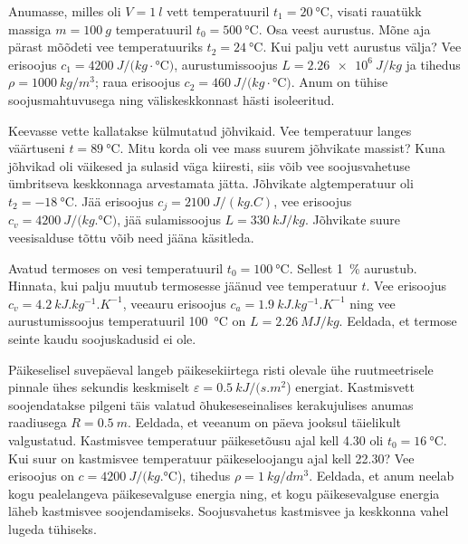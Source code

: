 \documentclass[10pt]{article}
\begin{document}
{
Anumasse, milles oli $V=\SI{1}{l}$ vett temperatuuril $t_1=\SI{20}{\degreeCelsius}$,
visati rauatükk massiga $m=\SI{100}{g}$ temperatuuril $t_0=\SI{500}{\degreeCelsius}$. Osa
veest aurustus. Mõne aja pärast mõõdeti vee temperatuuriks
$t_2=\SI{24}{\degreeCelsius}$. Kui palju vett aurustus välja? Vee erisoojus
$c_1=\SI{4200}{J/(kg\cdot\degreeCelsius)}$, aurustumissoojus $L=\SI{2,26 e6}{J/kg}$ ja
tihedus $\rho=\SI{1000}{kg/m^3}$; raua
erisoojus $c_2=\SI{460}{J/(kg\cdot\degreeCelsius)}$. Anum on tühise soojusmahtuvusega ning väliskeskkonnast
hästi isoleeritud.
\probend
\bigskip


Keevasse vette kallatakse külmutatud jõhvikaid. Vee temperatuur langes väärtuseni $t=\SI{89}{\degreeCelsius}$.
Mitu korda oli vee mass suurem jõhvikate massist? Kuna jõhvikad oli väikesed ja sulasid väga kiiresti, siis
võib vee soojusvahetuse ümbritseva keskkonnaga arvestamata jätta. Jõhvikate algtemperatuur oli
$t_2=\SI{-18}{\degreeCelsius}$. Jää erisoojus $c_j=\SI{2100}{J/(kg.C)}$, vee erisoojus $c_v=\SI{4200}{J/(kg.\degreeCelsius)}$, jää sulamissoojus $L=\SI{330}{kJ/kg}$. Jõhvikate suure veesisalduse tõttu võib need jääna käsitleda.
\probend
\bigskip


Avatud termoses on vesi temperatuuril $t_0 = \SI{100}{\degreeCelsius}$. Sellest \SI{1}{\%}
aurustub. Hinnata, kui palju muutub termosesse jäänud vee temperatuur $t$.
Vee erisoojus $c_v = \SI{4,2}{kJ.kg^{-1}.K^{-1}}$, veeauru erisoojus $c_a = \SI{1,9}{kJ.kg^{-1}.K^{-1}}$ ning
vee aurustumissoojus temperatuuril \SI{100}{\degreeCelsius} on $L = \SI{2,26}{MJ/kg}$. Eeldada, et termose seinte kaudu soojuskadusid ei ole.
\probend
\bigskip


Päikeselisel suvepäeval langeb päikesekiirtega risti olevale ühe ruutmeetrisele pinnale ühes sekundis keskmiselt $\varepsilon = \SI{0,5}{kJ/(s.m^2}$) energiat. Kastmisvett soojendatakse pilgeni täis valatud õhukeseseinalises kerakujulises anumas raadiusega $R = \SI{0,5}{m}$. Eeldada, et veeanum on päeva jooksul täielikult valgustatud. Kastmisvee temperatuur päikesetõusu ajal kell 4.30 oli $t_0 = \SI{16}{\degreeCelsius}$. Kui suur on kastmisvee temperatuur päikeseloojangu ajal kell 22.30? Vee erisoojus on $c = \SI{4200}{J/(kg.\degreeCelsius}$), tihedus $\rho = \SI{1}{kg/dm^3}$. Eeldada, et anum neelab kogu pealelangeva päikesevalguse energia ning, et kogu päikesevalguse energia läheb kastmisvee soojendamiseks. Soojusvahetus kastmisvee ja keskkonna vahel lugeda tühiseks.
\probend
\bigskip

}
\end{document}
